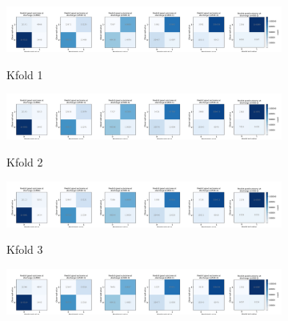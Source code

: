 \begin{figure}[!h]
    \centering
    \begin{subfigure}[b]{1\textwidth}
      \centering
      \includegraphics[width=1\textwidth]{./images/073_xgb_all_features_5fold_binary_confusion_matrices_per_binary_threshold_kfold0}\\
      \caption{Kfold 1}
      \label{fig:results_waterfall}
    \end{subfigure}
    \hfill
    \begin{subfigure}[b]{1\textwidth}
      \centering    
      \includegraphics[width=1\textwidth]{./images/073_xgb_all_features_5fold_binary_confusion_matrices_per_binary_threshold_kfold1}\\
      \caption{Kfold 2}
      \label{fig:results_waterfall}
    \end{subfigure}
    \hfill
    \begin{subfigure}[b]{1\textwidth}
      \centering
      \includegraphics[width=1\textwidth]{./images/073_xgb_all_features_5fold_binary_confusion_matrices_per_binary_threshold_kfold2}\\
      \caption{Kfold 3}
      \label{fig:results_waterfall}
    \end{subfigure}
    \hfill
    \begin{subfigure}[b]{1\textwidth}
      \centering
      \includegraphics[width=1\textwidth]{./images/073_xgb_all_features_5fold_binary_confusion_matrices_per_binary_threshold_kfold3}\\

\end{subfigure}
\end{figure}
